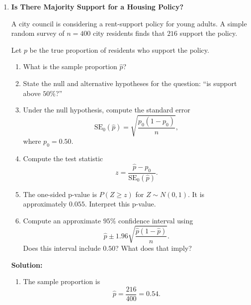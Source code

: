 \documentclass[12pt]{article}
\newif\ifsolutions
\begin{document}
\begin{enumerate}
\begin{enumerate}[label=(\alph*)]
        For \( n = 100 \):
        \[
        \sigma_{\bar{Y}} = \frac{10}{\sqrt{100}} = 1, \quad Z = \frac{153 - 150}{1} = 3.
        \]
        In this case $P(Z > 3) = \texttt{pnorm(3, lower.tail = FALSE)} \approx 0.0013$.
    \end{enumerate} 
        
    \textbf{Conclusion:} While individual probabilities depend on the normal assumption, the Central Limit Theorem lets us approximate probabilities about sample means. As \(n\) grows, the same deviation from the population mean becomes less likely.
    
    \fi \color{black}
    
    \item \textbf{Is There Majority Support for a Housing Policy?}

    A city council is considering a rent-support policy for young adults. A simple random survey of \(n = 400\) city residents finds that \(216\) support the policy.

    Let \(p\) be the true proportion of residents who support the policy.

    \begin{enumerate}[label=(\alph*)]
        \item What is the sample proportion \(\hat{p}\)?
        \item State the null and alternative hypotheses for the question: ``is support above \(50\%\)?''
        \item Under the null hypothesis, compute the standard error
        \[
            \mathrm{SE}_0(\hat{p}) = \sqrt{\frac{p_0(1-p_0)}{n}},
        \]
        where \(p_0 = 0.50\).
        \item Compute the test statistic
        \[
            z = \frac{\hat{p} - p_0}{\mathrm{SE}_0(\hat{p})}.
        \]
        \item The one-sided p-value is \(P(Z \geq z)\) for \(Z \sim N(0,1)\). It is approximately \(0.055\). Interpret this p-value.
        \item Compute an approximate \(95\%\) confidence interval using
        \[
            \hat{p} \pm 1.96 \sqrt{\frac{\hat{p}(1-\hat{p})}{n}}.
        \]
        Does this interval include \(0.50\)? What does that imply?
    \end{enumerate}

    \ifsolutions \color{blue} \textbf{Solution:} \\
    \begin{enumerate}[label=(\alph*)]
        \item The sample proportion is
        \[
            \hat{p} = \frac{216}{400} = 0.54.
        \]


\end{enumerate}
\end{enumerate}
\end{document}
